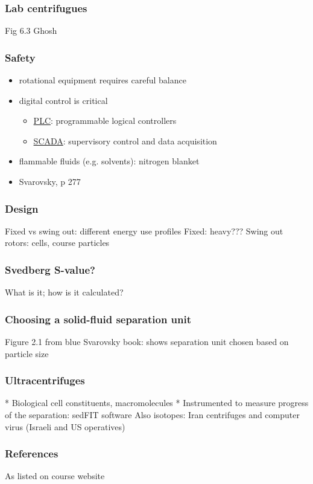 \begin{frame}\frametitle{Lab centrifugues}
	Fig 6.3 Ghosh
\end{frame}

\begin{frame}\frametitle{Safety}
	\begin{itemize}
		\item	rotational equipment requires careful balance
		\item	digital control is critical
		\begin{itemize}
			\item	\href{http://en.wikipedia.org/wiki/Programmable_logic_controller}{PLC}: programmable logical controllers 
			\item	\href{http://en.wikipedia.org/wiki/SCADA}{SCADA}: supervisory control and data acquisition
		\end{itemize} 
		\item	flammable fluids (e.g. solvents): nitrogen blanket
		\item	Svarovsky, p 277
	\end{itemize}
\end{frame}

\begin{frame}\frametitle{Design}
	Fixed vs swing out: different energy use profiles
	Fixed: heavy???
	Swing out rotors: cells, course particles
\end{frame}

\begin{frame}\frametitle{Svedberg S-value?}
	What is it;
	how is it calculated?
\end{frame}

\begin{frame}\frametitle{Choosing a solid-fluid separation unit}
	Figure 2.1 from blue Svarovsky book: shows separation unit chosen based on particle size
\end{frame}

\begin{frame}\frametitle{Ultracentrifuges}
	* Biological cell constituents, macromolecules
	* Instrumented to measure progress of the separation: sedFIT software
	Also isotopes: Iran centrifuges and computer virus (Israeli and US operatives)
\end{frame}

\begin{frame}\frametitle{References}
	As listed on course website
\end{frame}

